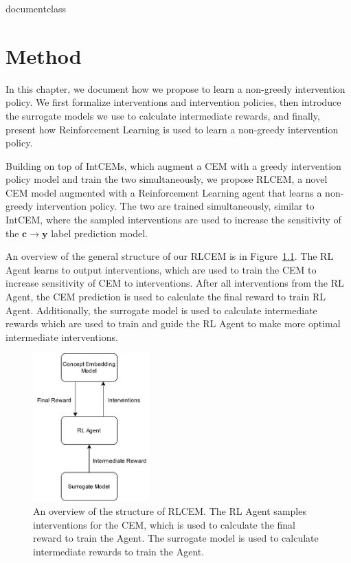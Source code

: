 \csname documentclass

\chapter{Method}


In this chapter, we document how we propose 
to learn a non-greedy intervention policy.
We first
formalize interventions and intervention policies,
then introduce the surrogate models we use
to calculate intermediate rewards,
and finally, present how Reinforcement Learning is used 
to learn a non-greedy intervention policy.

Building on top of IntCEMs, which augment a CEM
with a greedy intervention policy model and train the two simultaneously,
we propose RLCEM,
a novel CEM model augmented with a Reinforcement Learning agent
that learns a non-greedy intervention policy.
The two are trained simultaneously, similar to IntCEM, 
where the sampled interventions are used to increase the sensitivity of the
$\mathbf{c} \to \mathbf{y}$ label prediction model.

An overview of the general structure of our RLCEM is in Figure~\ref{fig:rlcem-overview}.
The RL Agent learns to output interventions, which are 
used to train the CEM to increase sensitivity of 
CEM to interventions. After all interventions from the RL Agent,
the CEM prediction is used to calculate the final
reward to train RL Agent. Additionally, the surrogate model
is used to calculate intermediate rewards which are used to train and guide the 
RL Agent to make more optimal intermediate interventions.

\begin{figure}[!ht]
    \centering
    \includegraphics[width=0.4\textwidth]{figs/method/rlcem_overview.png}
    \caption{An overview of the structure of RLCEM. The RL Agent samples interventions for the CEM, which is used to calculate
    the final reward to train the Agent. The surrogate model is used to calculate intermediate rewards
    to train the Agent.}
    \label{fig:rlcem-overview}
\end{figure}

